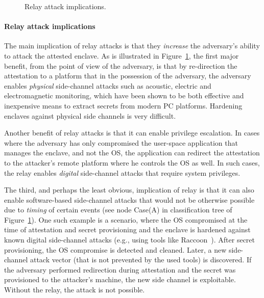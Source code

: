 \begin{figure}[t]
    
    \caption{Relay attack implications.}
    \label{fig:relayTree}
\end{figure}            

\paragraph{Relay attack implications}
The main implication of relay attacks is that they \emph{increase} the adversary's ability to attack the attested enclave. As is illustrated in Figure~\ref{fig:relayTree}, the first major benefit, from the point of view of the adversary, is that by re-direction the attestation to a platform that in the possession of the adversary, the adversary enables \emph{physical} side-channel attacks such as acoustic, electric and electromagnetic monitoring, which have been shown to be both effective and inexpensive means to extract secrets from modern PC platforms. Hardening enclaves against physical side channels is very difficult. 

Another benefit of relay attacks is that it can enable privilege escalation. In cases where the adversary has only compromised the user-space application that manages the enclave, and not the OS, the application can redirect the attestation to the attacker's remote platform where he controls the OS as well. In such cases, the relay enables \emph{digital} side-channel attacks that require system privileges.

The third, and perhaps the least obvious, implication of relay is that it can also enable software-based side-channel attacks that would not be otherwise possible due to \emph{timing} of certain events (see node Case(A) in classification tree of Figure~\ref{fig:relayTree}). One such example is a scenario, where the OS compromised at the time of attestation and secret provisioning and the enclave is hardened against known digital side-channel attacks (e.g., using tools like Raccoon~\cite{raccoon}). After secret provisioning, the OS compromise is detected and cleaned. Later, a new side-channel attack vector (that is not prevented by the used tools) is discovered. If the adversary performed redirection during attestation and the secret was provisioned to the attacker's machine, the new side channel is exploitable. Without the relay, the attack is not possible.

